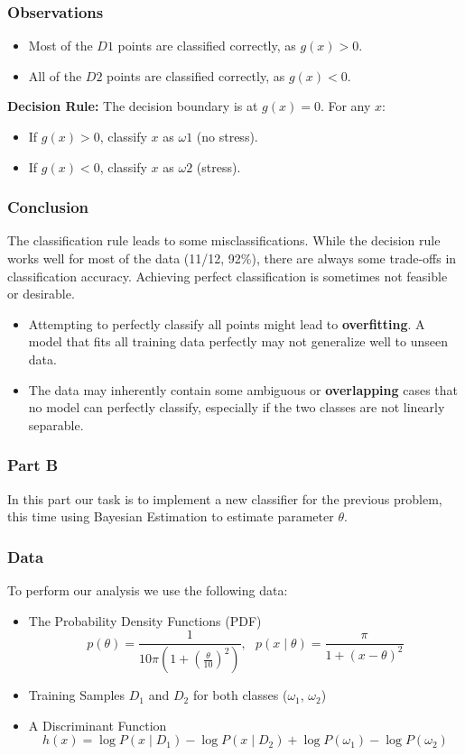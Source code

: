 \documentclass{beamer}
\begin{document}
\begin{frame}
\frametitle{Observations}
\begin{itemize}
    \item Most of the $D1$ points are classified correctly, as $g(x) > 0$.
    \item All of the $D2$ points are classified correctly, as $g(x) < 0$.
\end{itemize}
\vspace{1cm}
\textbf{Decision Rule:} The decision boundary is at $g(x) = 0$. For any $x$:
\begin{itemize}
    \item If $g(x) > 0$, classify $x$ as $ω1$ (no stress).
    \item If $g(x) < 0$, classify $x$ as $ω2$ (stress).
\end{itemize}
\end{frame}

\begin{frame}
\frametitle{Conclusion}
The classification rule leads to some misclassifications. While the decision rule works well for most of the data (11/12, 92\%), there are always some trade-offs in classification accuracy. Achieving perfect classification is sometimes not feasible or desirable.

\begin{itemize}
    \item Attempting to perfectly classify all points might lead to \textbf{overfitting}. A model that fits all training data perfectly may not generalize well to unseen data.
    \item The data may inherently contain some ambiguous or \textbf{overlapping} cases that no model can perfectly classify, especially if the two classes are not linearly separable.
\end{itemize}

\end{frame}


\begin{frame}
\frametitle{Part B}
In this part our task is to implement a new classifier for the previous problem, this time using Bayesian Estimation to estimate parameter $\theta$. 
\end{frame}


\begin{frame}
\frametitle{Data}

To perform our analysis we use the following data:
\begin{itemize}
    \item The Probability Density Functions (PDF)$$ p(\theta) = \frac{1}{10\pi \left( 1 + \left(\frac{\theta}{10}\right)^2 \right)}, \:\:\: p(x \mid \theta) = \frac{\pi}{1 + (x - \theta)^2} $$
    \item Training Samples $D_1$ and $D_2$ for both classes ($\omega_1$, $\omega_2$)
    \item A Discriminant Function $$ h(x) = \log P(x \mid D_1) - \log P(x \mid D_2) + \log P(\omega_1) - \log P(\omega_2) $$
\end{itemize}
\end{frame}
\end{document}
